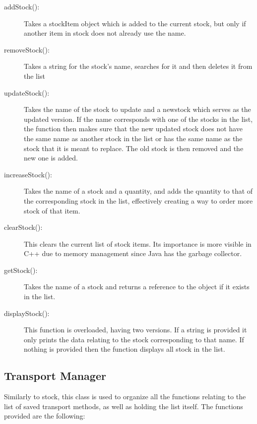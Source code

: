 \documentclass[12pt, a4paper]{report}
\begin{document}
\begin{description}
   \item [addStock():] Takes a stockItem object which is added to the current stock, but only if another item in stock does not already use the name.
   \item[removeStock():] Takes a string for the stock's name, searches for it and then deletes it from the list 
   \item[updateStock():] Takes the name of the stock to update and a newstock which serves as the updated version. If the name corresponds with one of the stocks in the list, the function then makes sure that the new updated stock does not have the same name as another stock in the list or has the same name as the stock that it is meant to replace. The old stock is then removed and the new one is added.
   \item[increaseStock():] Takes the name of a stock and a quantity, and adds the quantity to that of the corresponding stock in the list, effectively creating a way to order more stock of that item.
   \item[clearStock():] This clears the current list of stock items. Its importance is more visible in C++ due to memory management since Java has the garbage collector. 
   \item[getStock():] Takes the name of a stock and returns a reference to the object if it exists in the list.
   \item[displayStock():] This function is overloaded, having two versions. If a string is provided it only prints the data relating to the stock corresponding to that name. If nothing is provided then the function displays all stock in the list.
\end{description}

\subsection{Transport Manager}
Similarly to stock, this class is used to organize all the functions relating to the list of saved transport methods, as well as holding the list itself. The functions provided are the following:\\
\end{document}

